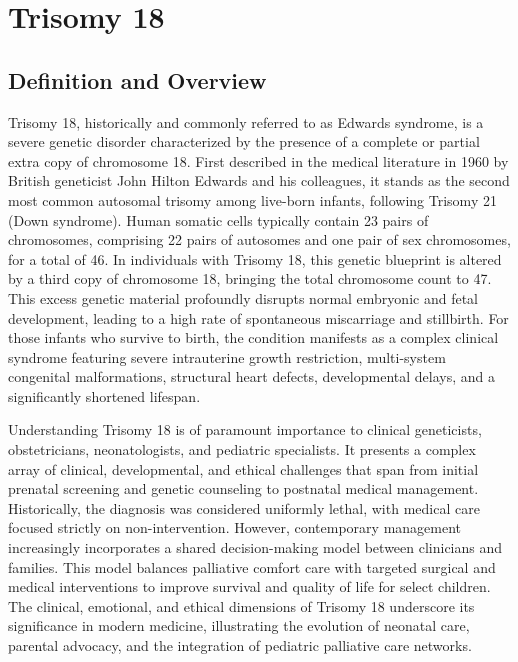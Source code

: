 \chapter{Trisomy 18}

\section*{Definition and Overview}
Trisomy 18, historically and commonly referred to as Edwards syndrome, is a severe genetic disorder characterized by the presence of a complete or partial extra copy of chromosome 18. First described in the medical literature in 1960 by British geneticist John Hilton Edwards and his colleagues, it stands as the second most common autosomal trisomy among live-born infants, following Trisomy 21 (Down syndrome). Human somatic cells typically contain 23 pairs of chromosomes, comprising 22 pairs of autosomes and one pair of sex chromosomes, for a total of 46. In individuals with Trisomy 18, this genetic blueprint is altered by a third copy of chromosome 18, bringing the total chromosome count to 47. This excess genetic material profoundly disrupts normal embryonic and fetal development, leading to a high rate of spontaneous miscarriage and stillbirth. For those infants who survive to birth, the condition manifests as a complex clinical syndrome featuring severe intrauterine growth restriction, multi-system congenital malformations, structural heart defects, developmental delays, and a significantly shortened lifespan.

Understanding Trisomy 18 is of paramount importance to clinical geneticists, obstetricians, neonatologists, and pediatric specialists. It presents a complex array of clinical, developmental, and ethical challenges that span from initial prenatal screening and genetic counseling to postnatal medical management. Historically, the diagnosis was considered uniformly lethal, with medical care focused strictly on non-intervention. However, contemporary management increasingly incorporates a shared decision-making model between clinicians and families. This model balances palliative comfort care with targeted surgical and medical interventions to improve survival and quality of life for select children. The clinical, emotional, and ethical dimensions of Trisomy 18 underscore its significance in modern medicine, illustrating the evolution of neonatal care, parental advocacy, and the integration of pediatric palliative care networks.

